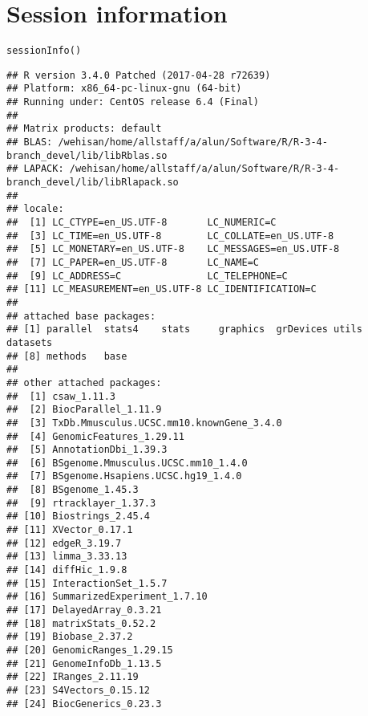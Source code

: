 \documentclass{report}\usepackage[]{graphicx}\usepackage[usenames,dvipsnames]{color}
\newcommand{\hlstd}[1]{\textcolor[rgb]{0.251,0.251,0.251}{#1}}%
\newcommand{\hlkwd}[1]{\textcolor[rgb]{0.878,0.439,0.125}{#1}}%
\newenvironment{knitrout}{}{} %
\begin{document}
\section{Session information}
\begin{knitrout}
\color{fgcolor}\begin{kframe}
\begin{alltt}
\hlkwd{sessionInfo}\hlstd{()}
\end{alltt}
\begin{verbatim}
## R version 3.4.0 Patched (2017-04-28 r72639)
## Platform: x86_64-pc-linux-gnu (64-bit)
## Running under: CentOS release 6.4 (Final)
## 
## Matrix products: default
## BLAS: /wehisan/home/allstaff/a/alun/Software/R/R-3-4-branch_devel/lib/libRblas.so
## LAPACK: /wehisan/home/allstaff/a/alun/Software/R/R-3-4-branch_devel/lib/libRlapack.so
## 
## locale:
##  [1] LC_CTYPE=en_US.UTF-8       LC_NUMERIC=C              
##  [3] LC_TIME=en_US.UTF-8        LC_COLLATE=en_US.UTF-8    
##  [5] LC_MONETARY=en_US.UTF-8    LC_MESSAGES=en_US.UTF-8   
##  [7] LC_PAPER=en_US.UTF-8       LC_NAME=C                 
##  [9] LC_ADDRESS=C               LC_TELEPHONE=C            
## [11] LC_MEASUREMENT=en_US.UTF-8 LC_IDENTIFICATION=C       
## 
## attached base packages:
## [1] parallel  stats4    stats     graphics  grDevices utils     datasets 
## [8] methods   base     
## 
## other attached packages:
##  [1] csaw_1.11.3                             
##  [2] BiocParallel_1.11.9                     
##  [3] TxDb.Mmusculus.UCSC.mm10.knownGene_3.4.0
##  [4] GenomicFeatures_1.29.11                 
##  [5] AnnotationDbi_1.39.3                    
##  [6] BSgenome.Mmusculus.UCSC.mm10_1.4.0      
##  [7] BSgenome.Hsapiens.UCSC.hg19_1.4.0       
##  [8] BSgenome_1.45.3                         
##  [9] rtracklayer_1.37.3                      
## [10] Biostrings_2.45.4                       
## [11] XVector_0.17.1                          
## [12] edgeR_3.19.7                            
## [13] limma_3.33.13                           
## [14] diffHic_1.9.8                           
## [15] InteractionSet_1.5.7                    
## [16] SummarizedExperiment_1.7.10             
## [17] DelayedArray_0.3.21                     
## [18] matrixStats_0.52.2                      
## [19] Biobase_2.37.2                          
## [20] GenomicRanges_1.29.15                   
## [21] GenomeInfoDb_1.13.5                     
## [22] IRanges_2.11.19                         
## [23] S4Vectors_0.15.12                       
## [24] BiocGenerics_0.23.3                     

\end{verbatim}
\end{kframe}
\end{knitrout}
\end{document}
